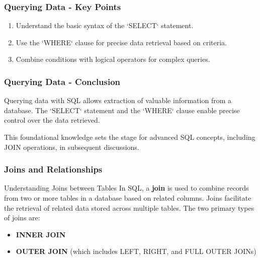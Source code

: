 \documentclass[aspectratio=169]{beamer}
\begin{document}
\begin{frame}[fragile]
    \frametitle{Querying Data - Key Points}
    \begin{enumerate}
        \item Understand the basic syntax of the `SELECT` statement.
        \item Use the `WHERE` clause for precise data retrieval based on criteria.
        \item Combine conditions with logical operators for complex queries.
    \end{enumerate}
\end{frame}

\begin{frame}[fragile]
    \frametitle{Querying Data - Conclusion}
    Querying data with SQL allows extraction of valuable information from a database. The `SELECT` statement and the `WHERE` clause enable precise control over the data retrieved.

    This foundational knowledge sets the stage for advanced SQL concepts, including JOIN operations, in subsequent discussions.
\end{frame}

\begin{frame}
    \frametitle{Joins and Relationships}
    \begin{block}{Understanding Joins between Tables}
        In SQL, a \textbf{join} is used to combine records from two or more tables in a database based on related columns. Joins facilitate the retrieval of related data stored across multiple tables. The two primary types of joins are:
    \end{block}
    \begin{itemize}
        \item \textbf{INNER JOIN}
        \item \textbf{OUTER JOIN} (which includes LEFT, RIGHT, and FULL OUTER JOINs)
    \end{itemize}
\end{frame}
\end{document}
